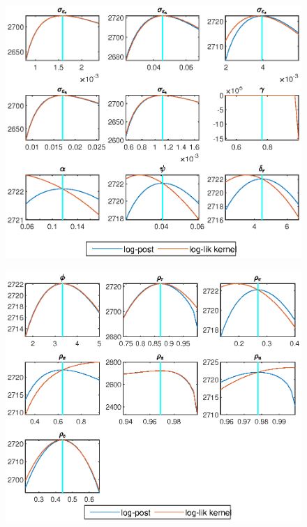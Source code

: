 \documentclass[11pt,preprint, authoryear]{elsarticle}
\let\origfigure\figure
\let\endorigfigure\endfigure
\renewenvironment{figure}[1][2] {
    \expandafter\origfigure\expandafter[H]
} {
    \endorigfigure
}
\numberwithin{equation}{section}
\numberwithin{figure}{section}
\numberwithin{table}{section}
\begin{document}
\begin{figure}
     \centering
     \begin{subfigure}[H]{0.49\textwidth}
         \centering
         \includegraphics[width=\textwidth]{code/mode_check1}
     \end{subfigure}
     \begin{subfigure}[H]{0.49\textwidth}
         \centering
         \includegraphics[width=\textwidth]{code/mode_check2}
     \end{subfigure}
        \caption{Estimated structural parameters mode check plots for benchmark sample under Taylor rule. The difference in the shapes of the likelihood kernel (red line) and the posterior likelihood
(blue line) indicates the role of the prior in influencing the curvature of the likelihood function.}
        \label{mc1}
\end{figure}
\end{document}
